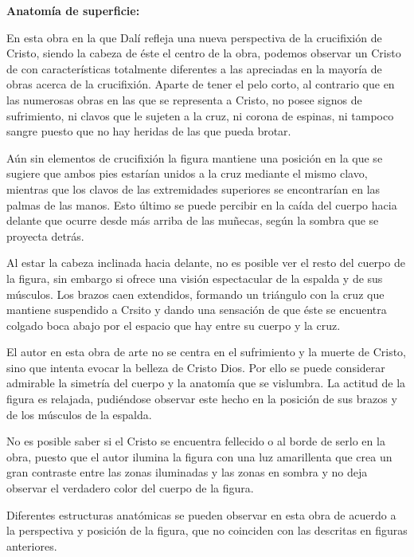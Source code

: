 
\vspace{12pt}
\textbf{Anatomía de superficie:}

En esta obra en la que Dalí refleja una nueva perspectiva de la crucifixión de Cristo, siendo la cabeza de éste el centro de la obra, podemos observar un Cristo de con características totalmente diferentes a las apreciadas en la mayoría de obras acerca de la crucifixión. Aparte de tener el pelo corto, al contrario que en las numerosas obras en las que se representa a Cristo, no posee signos de sufrimiento, ni clavos que le sujeten a la cruz, ni corona de espinas, ni tampoco sangre puesto que no hay heridas de las que pueda brotar.

Aún sin elementos de crucifixión la figura mantiene una posición en la que se sugiere que ambos pies estarían unidos a la cruz mediante el mismo clavo, mientras que los clavos de las extremidades superiores se encontrarían en las palmas de las manos. Esto último se puede percibir en la caída del cuerpo hacia delante que ocurre desde más arriba de las muñecas, según la sombra que se proyecta detrás.

Al estar la cabeza inclinada hacia delante, no es posible ver el resto del cuerpo de la figura, sin embargo si ofrece una visión espectacular de la espalda y de sus músculos. Los brazos caen extendidos, formando un triángulo con la cruz que mantiene suspendido a Crsito y dando una sensación de que éste se encuentra colgado boca abajo por el espacio que hay entre su cuerpo y la cruz.

El autor en esta obra de arte no se centra en el sufrimiento y la muerte de Cristo, sino que intenta evocar la belleza de Cristo Dios. Por ello se puede considerar admirable la simetría del cuerpo y la anatomía que se vislumbra. La actitud de la figura es relajada, pudiéndose observar este hecho en la posición de sus brazos y de los músculos de la espalda.

No es posible saber si el Cristo se encuentra fellecido o al borde de serlo en la obra, puesto que el autor ilumina la figura con una luz amarillenta que crea un gran contraste entre las zonas iluminadas y las zonas en sombra y no deja observar el verdadero color del cuerpo de la figura.

Diferentes estructuras anatómicas se pueden observar en esta obra de acuerdo a la perspectiva y posición de la figura, que no coinciden con las descritas en figuras anteriores.

